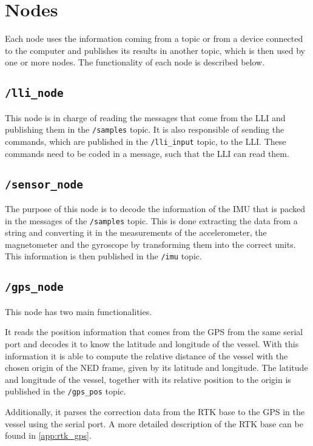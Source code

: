 \section{Nodes}
Each node uses the information coming from a topic or from a device connected to the computer and publishes its results in another topic, which is then used by one or more nodes. The functionality of each node is described below.

\subsection*{\lstinline[style=cinline]{/lli_node}}
This node is in charge of reading the messages that come from the LLI and publishing them in the \lstinline[style=cinline]{/samples} topic. It is also responsible of sending the commands, which are published in the \lstinline[style=cinline]{/lli_input} topic, to the LLI. These commands need to be coded in a message, such that the LLI can read them.

\subsection*{\lstinline[style=cinline]{/sensor_node}}
The purpose of this node is to decode the information of the IMU that is packed in the messages of the \lstinline[style=cinline]{/samples} topic. This is done extracting the data from a string and converting it in the measurements of the accelerometer, the magnetometer and the gyroscope by transforming them into the correct units. This information is then published in the \lstinline[style=cinline]{/imu} topic.

\subsection*{\lstinline[style=cinline]{/gps_node}}
This node has two main functionalities. 

It reads the position information that comes from the GPS from the same serial port and decodes it to know the latitude and longitude of the vessel. With this information it is able to compute the relative distance of the vessel with the chosen origin of the NED frame, given by its latitude and longitude. The latitude and longitude of the vessel, together with its relative position to the origin is published in the \lstinline[style=cinline]{/gps_pos} topic.

Additionally, it parses the correction data from the RTK base to the GPS in the vessel using the serial port. A more detailed description of the RTK base can be found in \autoref{app:rtk_gps}. 

